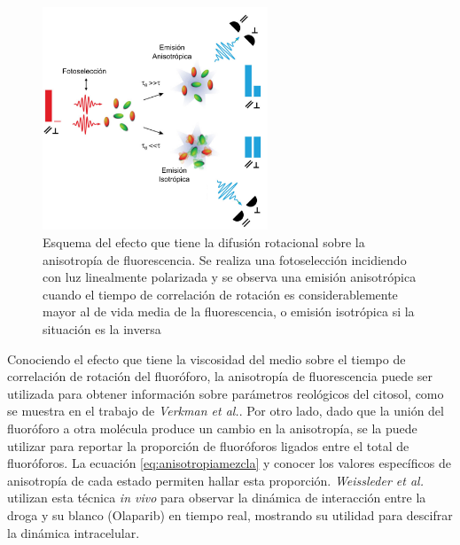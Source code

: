 \begin{figure}
    \centering
    \includegraphics[width=0.6\textwidth]{./img/DifusionRotacional.png}
    \caption{Esquema del efecto que tiene la difusión rotacional sobre la anisotropía de fluorescencia. Se realiza una fotoselección incidiendo con luz linealmente polarizada y se observa una emisión anisotrópica cuando el tiempo de correlación de rotación es considerablemente mayor al de vida media de la fluorescencia, o emisión isotrópica si la situación es la inversa\cite{Dubach2014}}
    \label{fig:DifusionRotacional}
\end{figure}

Conociendo el efecto que tiene la viscosidad del medio sobre el tiempo de correlación de rotación del fluoróforo, la anisotropía de fluorescencia puede ser utilizada para obtener información sobre parámetros reológicos del citosol, como se muestra en el trabajo de \textit{Verkman et al.}\cite{Swaminathan1997}. Por otro lado, dado que la unión del fluoróforo a otra molécula produce un cambio en la anisotropía, se la puede utilizar para reportar la proporción de fluoróforos ligados entre el total de fluoróforos. La ecuación \ref{eq:anisotropiamezcla} y conocer los valores específicos de anisotropía de cada estado permiten hallar esta proporción. \textit{Weissleder et al.}\cite{Dubach2014} utilizan esta técnica \textit{in vivo} para observar la dinámica de interacción entre la droga y su blanco (Olaparib) en tiempo real, mostrando su utilidad para descifrar la dinámica intracelular.


